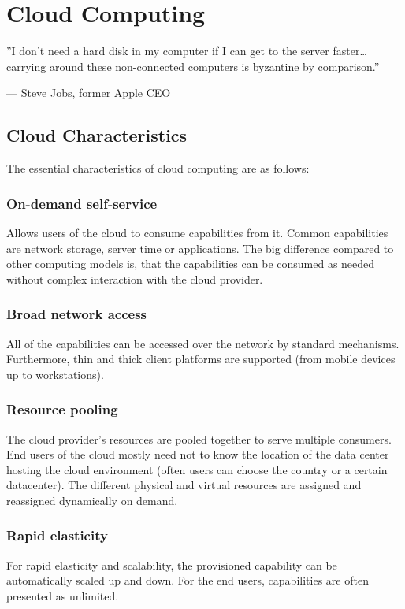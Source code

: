 \section{Cloud Computing}

\epigraph{''I don’t need a hard disk in my computer if I can get to the server faster\dots \\ carrying around these non-connected computers is byzantine by comparison.''}{--- \textup{Steve Jobs}, former Apple CEO}

\subsection{Cloud Characteristics}
The essential characteristics of cloud computing are as follows\cite{cloud_characteristics}\cite{nist}:

\subsubsection{On-demand self-service}
Allows users of the cloud to consume capabilities from it. Common capabilities are network storage, server time or applications. The big difference compared to other computing models is, that the capabilities can be consumed as needed without complex interaction with the cloud provider. 

\subsubsection{Broad network access}
All of the capabilities can be accessed over the network by standard mechanisms. Furthermore, thin and thick client platforms are supported (from mobile devices up to workstations).

\subsubsection{Resource pooling}
The cloud provider's resources are pooled together to serve multiple consumers. End users of the cloud mostly need not to know the location of the data center hosting the cloud environment (often users can choose the country or a certain datacenter). The different physical and virtual resources are assigned and reassigned dynamically on demand.

\subsubsection{Rapid elasticity}
For rapid elasticity and scalability, the provisioned capability can be automatically scaled up and down. For the end users, capabilities are often presented as unlimited.

